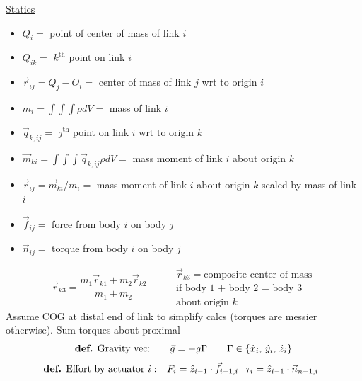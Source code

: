 \documentclass[twocolumn, 12pt]{article}    %
\begin{document}
\noindent\underline{Statics}\\
\begin{itemize}
    \item \(Q_i=\)  point of center of mass of link \(i\)
    \item \(Q_{ik}=\) \(k^{\text{th}}\) point on link \(i\) 
    \item \(\vec{r}_{ij}= Q_j - O_i= \) center of mass of link \(j\) wrt to origin \(i\)
    \item \(m_i = \int\int\int \rho dV=\)  mass of link \(i\)   
    \item \(\vec{q}_{k,ij}=\) \(j^{\text{th}}\) point on link \(i\) wrt to origin \(k\)
    \item \(\vec{m}_{ki} = \int\int\int \vec{q}_{k,ij} \rho dV=\) mass moment of link \(i\) about origin \(k\)
    \item \(\vec{r}_{ij} = \vec{m}_{ki}/m_i=\) mass moment of link \(i\) about origin \(k\) scaled by mass of link \(i\)
    \item \(\vec{f}_{ij}=\) force from body \(i\) on body \(j\)
    \item \(\vec{n}_{ij}=\) torque from body \(i\) on body \(j\)
\end{itemize}
\begin{equation*}
    \vec{r}_{k3} = \frac{m_1 \vec{r}_{k1} + m_2 \vec{r}_{k2}}{m_1+m_2} \hspace{30pt} \begin{matrix}
        \vec{r}_{k3} =\text{composite center of mass}\\
        \text{if body 1 + body 2 = body 3}\\
        \text{about origin }k
    \end{matrix}
\end{equation*}
Assume COG at distal end of link to simplify calcs (torques are messier otherwise). Sum torques about proximal
\begin{equation*}
    \text{\textbf{def.} Gravity vec:} \hspace{20pt} \vec{g} = -g \Gamma \hspace{20pt} \Gamma \in \{\hat{x}_i,\, \hat{y}_i,\, \hat{z}_i\}
\end{equation*}
\begin{equation*}
    \hspace{-5pt}\text{\textbf{def.} Effort by actuator } i: \hspace{7.5pt} F_i = \hat{z}_{i-1} \cdot \vec{f}_{i-1,i} \hspace{7.5pt} \tau_i = \hat{z}_{i-1} \cdot \vec{n}_{n-1,i}
\end{equation*}
\end{document}
